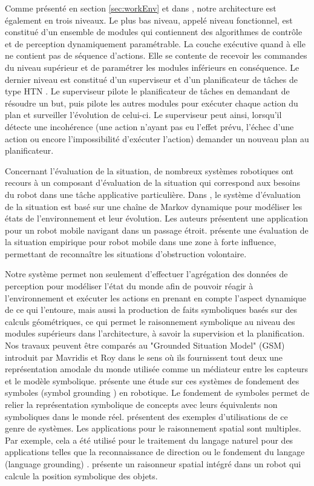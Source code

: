 \documentclass[a4paper,11pt,twoside]{StyleThese}
\begin{document}
Comme présenté en section \ref{sec:workEnv} et dans \cite{Alami1998}, notre architecture est également en trois niveaux. Le plus bas niveau, appelé niveau fonctionnel, est constitué d'un ensemble de modules qui contiennent des algorithmes de contrôle et de perception dynamiquement paramétrable.
La couche exécutive quand à elle ne contient pas de séquence d'actions. Elle se contente de recevoir les commandes du niveau supérieur et de paramétrer les modules inférieurs en conséquence. Le dernier niveau est constitué d'un superviseur \cite{fioreiser2014} et d'un planificateur de tâches de type HTN \cite{Guitton2012}. Le superviseur pilote le planificateur de tâches en demandant de résoudre un but, puis pilote les autres modules pour exécuter chaque action du plan et surveiller l'évolution de celui-ci.
Le superviseur peut ainsi, lorsqu'il détecte une incohérence (une action n'ayant pas eu l'effet prévu, l'échec d'une action ou encore l'impossibilité d'exécuter l'action) demander un nouveau plan au planificateur. 


Concernant l'évaluation de la situation, de nombreux systèmes robotiques ont recours à un composant d'évaluation de la situation qui correspond aux besoins du robot dans une tâche applicative particulière. Dans \cite{beck2011}, le système d'évaluation de la situation est basé sur une chaîne de Markov dynamique pour modéliser les états de l'environnement et leur évolution. Les auteurs présentent une application pour un robot mobile navigant dans un passage étroit.
\cite{Kluge01situationassessment} présente une évaluation de la situation empirique pour robot mobile dans une zone à forte influence, permettant de reconnaître les situations d'obstruction volontaire.

Notre système permet non seulement d'effectuer l'agrégation des données de perception pour modéliser l'état du monde afin de pouvoir réagir à l'environnement et exécuter les actions en prenant en compte l'aspect dynamique de ce qui l'entoure, mais aussi la production de faits symboliques basés sur des calculs géométriques, ce qui permet le raisonnement symbolique au niveau des modules supérieurs dans l'architecture, à savoir la supervision et la planification.
Nos travaux peuvent être comparés au "Grounded Situation Model" (GSM) introduit par Mavridis et Roy \cite{Mavridis2005} dans le sens où ils fournissent tout deux une représentation amodale du monde utilisée comme un médiateur entre les capteurs et le modèle symbolique. 
\cite{Coradeschi2013} présente une étude sur ces systèmes de fondement des symboles (symbol grounding \cite{harnad1990symbol}) en robotique.
Le fondement de symboles permet de relier la représentation symbolique de concepts avec leurs équivalents non symboliques dans le monde réel.
\cite{Daoutis2009} \cite{Lemaignan2011}
présentent des exemples d'utilisations de ce genre de systèmes.
Les applications pour le raisonnement spatial \cite{OKeefe1999} sont multiples. Par exemple, cela a été utilisé pour le traitement du langage naturel pour des applications telles que la reconnaissance de direction \cite{Kollar10,Matuszek10}
ou le fondement du langage (language grounding) \cite{Tellex10}. \cite{Skubic2004} présente un raisonneur spatial intégré dans un robot qui calcule la position symbolique des objets.
\end{document}
